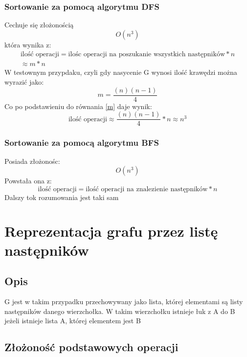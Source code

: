 \documentclass[]{article}
\begin{document}
		\subsubsection{Sortowanie za pomocą algorytmu DFS}
			Cechuje się złożonością
			\begin{equation}
				O(n^3)
			\end{equation}
			która wynika z:
			\begin{multline}
				\text{ilość operacji} =
				\text{ilośc operacji na poszukanie wszystkich następników} * n \\ \approx m * n 
				\label{m}
			\end{multline}
			W testownym przypdaku, czyli gdy nasycenie \gls{G} wynosi  ilość krawędzi można wyrazić jako:
			\begin{equation}
				m = \frac{(n)  (n - 1)}{4}
			\end{equation}
			Co po podstawieniu do równania \ref{m} daje wynik:
			\begin{equation}
				\text{ilość operacji} \approx \frac{(n)  (n - 1)}{4} *n \approx n^3 
			\end{equation}
		\subsubsection{Sortowanie za pomocą algorytmu BFS}
			Posiada złożonośc:
			\begin{equation}
				O(n^3)
			\end{equation}
			Powstała ona z:
			\begin{equation}
				\text{ilość operacji} = \text{ilość operacji na znalezienie następników} * n
			\end{equation}
			Dalszy tok rozumowania jest taki sam
\clearpage

\section{Reprezentacja grafu przez listę następników}
	\subsection{Opis}
		\gls{G} jest w takim przypadku przechowywany jako lista, której elementami są listy następników danego wierzchołka. W takim wierzchołku istnieje łuk z \gls{A} do \gls{B} jeżeli istnieje lista \gls{A}, której elementem jest \gls{B}
		
	\subsection{Złożoność podstawowych operacji}
\end{document}
